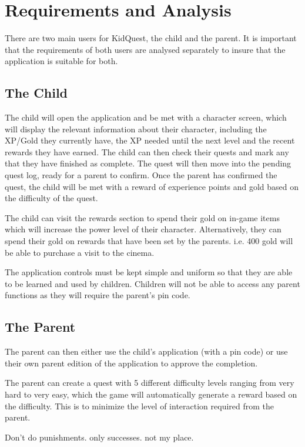 \chapter{Requirements and Analysis}
\label{chap:methodology}

There are two main users for KidQuest, the child and the parent. 
It is important that the requirements of both users are analysed separately to insure that the application is suitable for both.

\section{The Child}
The child will open the application and be met with a character screen, which will display the relevant information about their character, including the XP/Gold they currently have, the XP needed until the next level and the recent rewards they have earned.
The child can then check their quests and mark any that they have finished as complete.
The quest will then move into the pending quest log, ready for a parent to confirm.
Once the parent has confirmed the quest, the child will be met with a reward of experience points and gold based on the difficulty of the quest.

The child can visit the rewards section to spend their gold on in-game items which will increase the power level of their character. 
Alternatively, they can spend their gold on rewards that have been set by the parents. 
i.e. 400 gold will be able to purchase a visit to the cinema.

The application controls must be kept simple and uniform so that they are able to be learned and used by children.
Children will not be able to access any parent functions as they will require the parent's pin code. 

\section{The Parent}
The parent can then either use the child's application (with a pin code) or use their own parent edition of the application to approve the completion.

The parent can create a quest with 5 different difficulty levels ranging from very hard to very easy, which the game will automatically generate a reward based on the difficulty. 
This is to minimize the level of interaction required from the parent.

Don't do punishments. only successes. not my place.